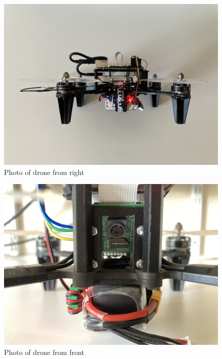 \newpage

\begin{figure}[!htb]
    \centering
    \includegraphics[width=\textwidth]{fig/drone/drone_right.jpg}
    \caption{Photo of drone from right}
\end{figure}

\newpage

\begin{figure}[!htb]
    \centering
    \includegraphics[width=\textwidth]{fig/drone/drone_front.jpg}
    \caption{Photo of drone from front}
\end{figure}

\newpage

